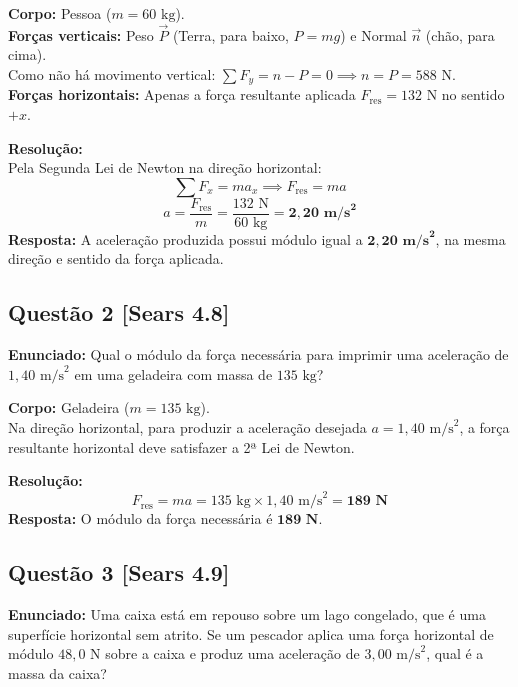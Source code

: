 \documentclass[11pt,a4paper]{article}
\begin{document}
\begin{dclbox}
\textbf{Corpo:} Pessoa ($m = 60\text{ kg}$).\\
\textbf{Forças verticais:} Peso $\vec{P}$ (Terra, para baixo, $P = mg$) e Normal $\vec{n}$ (chão, para cima).\\
Como não há movimento vertical: $\sum F_y = n - P = 0 \implies n = P = 588\text{ N}$.\\
\textbf{Forças horizontais:} Apenas a força resultante aplicada $F_{\text{res}} = 132\text{ N}$ no sentido $+x$.
\end{dclbox}

\noindent
\textbf{Resolução:}\\
Pela Segunda Lei de Newton na direção horizontal:
\[ \sum F_x = m a_x \implies F_{\text{res}} = m a \]
\[ a = \frac{F_{\text{res}}}{m} = \frac{132\text{ N}}{60\text{ kg}} = \mathbf{2,20\text{ m/s}^2} \]
\textbf{Resposta:} A aceleração produzida possui módulo igual a $\mathbf{2,20\text{ m/s}^2}$, na mesma direção e sentido da força aplicada.

\vspace{0.3cm}
\subsection*{Questão 2 [Sears 4.8]}
\textbf{Enunciado:} Qual o módulo da força necessária para imprimir uma aceleração de $1,40\text{ m/s}^2$ em uma geladeira com massa de $135\text{ kg}$?

\begin{dclbox}
\textbf{Corpo:} Geladeira ($m = 135\text{ kg}$).\\
Na direção horizontal, para produzir a aceleração desejada $a = 1,40\text{ m/s}^2$, a força resultante horizontal deve satisfazer a 2ª Lei de Newton.
\end{dclbox}

\noindent
\textbf{Resolução:}\\
\[ F_{\text{res}} = m a = 135\text{ kg} \times 1,40\text{ m/s}^2 = \mathbf{189\text{ N}} \]
\textbf{Resposta:} O módulo da força necessária é $\mathbf{189\text{ N}}$.

\vspace{0.3cm}
\subsection*{Questão 3 [Sears 4.9]}
\textbf{Enunciado:} Uma caixa está em repouso sobre um lago congelado, que é uma superfície horizontal sem atrito. Se um pescador aplica uma força horizontal de módulo $48,0\text{ N}$ sobre a caixa e produz uma aceleração de $3,00\text{ m/s}^2$, qual é a massa da caixa?
\end{document}

